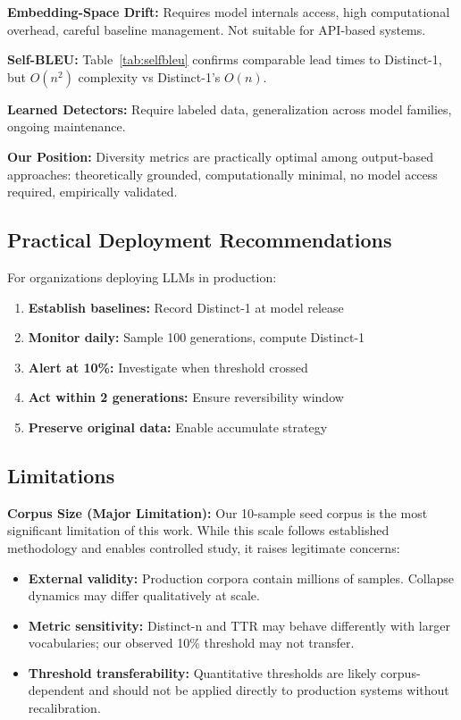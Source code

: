 \documentclass[conference]{IEEEtran}
\begin{document}
\textbf{Embedding-Space Drift:} Requires model internals access, high computational overhead, careful baseline management. Not suitable for API-based systems.

\textbf{Self-BLEU:} Table~\ref{tab:selfbleu} confirms comparable lead times to Distinct-1, but $O(n^2)$ complexity vs Distinct-1's $O(n)$.

\textbf{Learned Detectors:} Require labeled data, generalization across model families, ongoing maintenance.

\textbf{Our Position:} Diversity metrics are practically optimal among output-based approaches: theoretically grounded, computationally minimal, no model access required, empirically validated.

\subsection{Practical Deployment Recommendations}

For organizations deploying LLMs in production:

\begin{enumerate}
    \item \textbf{Establish baselines:} Record Distinct-1 at model release
    \item \textbf{Monitor daily:} Sample 100 generations, compute Distinct-1
    \item \textbf{Alert at 10\%:} Investigate when threshold crossed
    \item \textbf{Act within 2 generations:} Ensure reversibility window
    \item \textbf{Preserve original data:} Enable accumulate strategy
\end{enumerate}

\subsection{Limitations}
\label{sec:limitations}

\textbf{Corpus Size (Major Limitation):} Our 10-sample seed corpus is the most significant limitation of this work. While this scale follows established methodology \cite{shumailov2024nature} and enables controlled study, it raises legitimate concerns:

\begin{itemize}
    \item \textbf{External validity:} Production corpora contain millions of samples. Collapse dynamics may differ qualitatively at scale.
    \item \textbf{Metric sensitivity:} Distinct-n and TTR may behave differently with larger vocabularies; our observed 10\% threshold may not transfer.
    \item \textbf{Threshold transferability:} Quantitative thresholds are likely corpus-dependent and should not be applied directly to production systems without recalibration.
\end{itemize}
\end{document}
